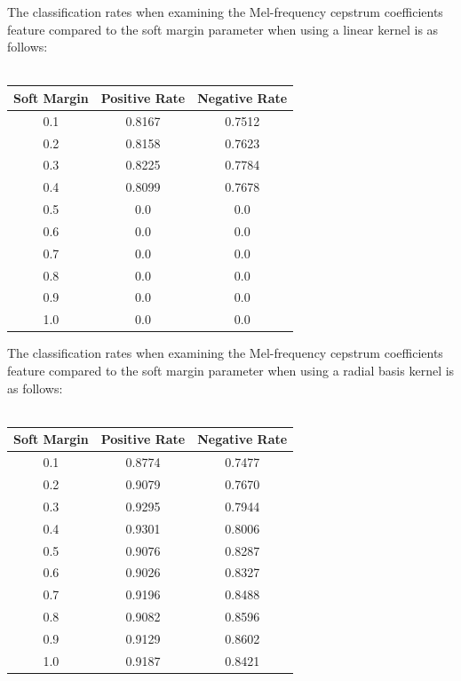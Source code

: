 \documentclass[twoside]{article}
\begin{document}
\begin{multicols}{2}
\newpage
The classification rates when examining the Mel-frequency cepstrum coefficients feature
compared to the soft margin parameter when using a linear kernel is as follows:\\ \\
\begin{tabular}{|c|c|c|}
	\hline
	Soft Margin 	& Positive Rate & Negative Rate \\ \hline
	0.1		& 0.8167	& 0.7512 \\ \hline
	0.2		& 0.8158	& 0.7623 \\ \hline
	0.3		& 0.8225	& 0.7784 \\ \hline
	0.4		& 0.8099	& 0.7678\\ \hline
	0.5		& 0.0	& 0.0\\ \hline
	0.6		& 0.0 	& 0.0\\ \hline
	0.7		& 0.0 	& 0.0\\ \hline
	0.8		& 0.0 	& 0.0\\ \hline
	0.9		& 0.0	& 0.0\\ \hline
	1.0		& 0.0	& 0.0 \\ \hline
\end{tabular}
The classification rates when examining the Mel-frequency cepstrum coefficients feature
compared to the soft margin parameter when using a radial basis kernel is as follows:\\ \\
\begin{tabular}{|c|c|c|}
	\hline
	Soft Margin 	& Positive Rate & Negative Rate \\ \hline
	0.1		& 0.8774	& 0.7477 \\ \hline
	0.2		& 0.9079	& 0.7670 \\ \hline
	0.3		& 0.9295	& 0.7944 \\ \hline
	0.4		& 0.9301	& 0.8006\\ \hline
	0.5		& 0.9076	& 0.8287\\ \hline
	0.6		& 0.9026	& 0.8327\\ \hline
	0.7		& 0.9196	& 0.8488\\ \hline
	0.8		& 0.9082	& 0.8596\\ \hline
	0.9		& 0.9129	& 0.8602\\ \hline
	1.0		& 0.9187	& 0.8421 \\ \hline
\end{tabular}

\end{multicols}
\end{document}
